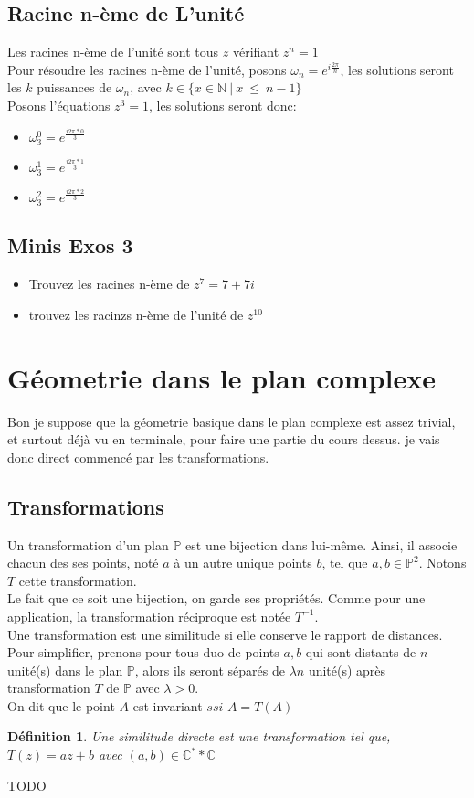 \documentclass{article}
\newtheorem{defi}{Définition}
\begin{document}
\subsection{Racine n-ème de L'unité}
Les racines n-ème de l'unité sont tous $z$ vérifiant $z^{n} = 1$\\
Pour résoudre les racines n-ème de l'unité, posons $\omega_{n} = e^{i\frac{2\pi}{n}}$, les solutions seront les $k$ puissances de $\omega_{n}$, avec $k \in \{x \in\mathbb{N}~|~x~\leq~n-1\}$\\
Posons l'équations $z^{3} = 1$, les solutions seront donc:
\begin{itemize}
  \item $\omega_{3}^{0}=e^{\frac{i2\pi*0}{3}}$
  \item $\omega_{3}^{1}=e^{\frac{i2\pi*1}{3}} $
  \item $\omega_{3}^{2}=e^{\frac{i2\pi*2}{3}}$
\end{itemize}

\subsection{Minis Exos 3}
\begin{itemize}
  \item Trouvez les racines n-ème de $z^{7} = 7 + 7i$
  \item trouvez les racinzs n-ème de l'unité de $z^{10}$
\end{itemize}

\section{Géometrie dans le plan complexe}

Bon je suppose que la géometrie basique dans le plan complexe est assez trivial, et surtout déjà vu en terminale, pour faire une partie du cours dessus. je vais donc direct commencé par les transformations.

\subsection{Transformations}
Un transformation d'un plan $\mathbb{P}$ est une bijection dans lui-même. Ainsi, il associe chacun des ses points, noté $a$ à un autre unique points $b$, tel que $a,b \in \mathbb{P}^{2}$. Notons $T$ cette transformation.\\
Le fait que ce soit une bijection, on garde ses propriétés. Comme pour une application, la transformation réciproque est notée $T^{-1}$.\\
Une transformation est une similitude si elle conserve le rapport de distances. Pour simplifier, prenons pour tous duo de points $a,b$ qui sont distants de $n$ unité(s) dans le plan $\mathbb{P}$, alors ils seront séparés de $\lambda n$ unité(s) après transformation $T$ de $\mathbb{P}$ avec $\lambda > 0$.\\
On dit que le point $A$ est invariant $ssi$ $A = T(A)$

\begin{defi}
Une similitude directe est une transformation tel que, $T(z)=az+b$ avec $(a,b) \in \mathbb{C}^{*} * \mathbb{C}$
\end{defi}
TODO
\end{document}
